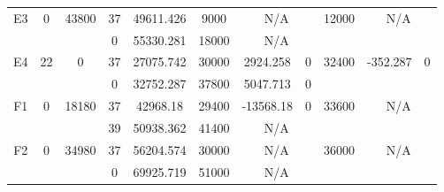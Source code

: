 \begin{sidewaystable}
\begin{tabular}{c||c|c||c|c|c|c|c||c|c|c}
         &
        
      \\
      \hline
      \multirow{2}{*}{E3} &
      \multirow{2}{*}{0} &
      \multirow{2}{*}{43800} &
      37 &
      49611.426 &
      9000 &
        \multicolumn{2}{|c||}{N/A} &
      \multirow{2}{*}{12000} &
        \multicolumn{2}{c}{\multirow{2}{*}{N/A}}
      \\
      \cline{4-8}
       &
       &
       &
      0 &
      55330.281 &
      18000 &
        \multicolumn{2}{|c||}{N/A} &
      
        
      \\
      \hline
      \multirow{2}{*}{E4} &
      \multirow{2}{*}{22} &
      \multirow{2}{*}{0} &
      37 &
      27075.742 &
      30000 &
        2924.258 &
        0 &
      \multirow{2}{*}{32400} &
        \multirow{2}{*}{-352.287} &
        \multirow{2}{*}{0}
      \\
      \cline{4-8}
       &
       &
       &
      0 &
      32752.287 &
      37800 &
        5047.713 &
        0 &
      
         &
        
      \\
      \hline
      \multirow{2}{*}{F1} &
      \multirow{2}{*}{0} &
      \multirow{2}{*}{18180} &
      37 &
      42968.18 &
      29400 &
        -13568.18 &
        0 &
      \multirow{2}{*}{33600} &
        \multicolumn{2}{c}{\multirow{2}{*}{N/A}}
      \\
      \cline{4-8}
       &
       &
       &
      39 &
      50938.362 &
      41400 &
        \multicolumn{2}{|c||}{N/A} &
      
        
      \\
      \hline
      \multirow{2}{*}{F2} &
      \multirow{2}{*}{0} &
      \multirow{2}{*}{34980} &
      37 &
      56204.574 &
      30000 &
        \multicolumn{2}{|c||}{N/A} &
      \multirow{2}{*}{36000} &
        \multicolumn{2}{c}{\multirow{2}{*}{N/A}}
      \\
      \cline{4-8}
       &
       &
       &
      0 &
      69925.719 &
      51000 &
        \multicolumn{2}{|c||}{N/A} &
      
        
      \\
\end{tabular}
\label{table:RDS2.txt-7588.tex} 
\end{sidewaystable}